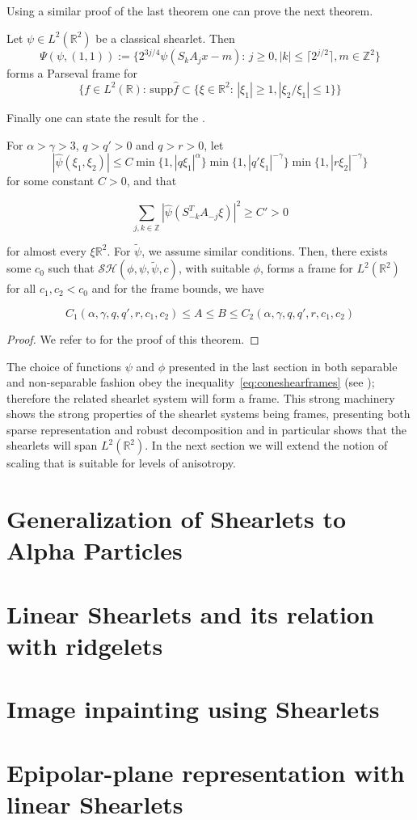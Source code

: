 Using a similar proof of the last theorem one can prove the next theorem.

\begin{thm}
Let $\psi\in L^2(\mathbb{R}^2)$ be a classical shearlet. Then 
$$
\Psi(\psi,(1,1)):=\{2^{3j/4}\psi(S_kA_jx-m)\text{: }j\geq 0,|k|\leq\lceil 2^{j/2}\rceil,m\in\mathbb{Z}^2\}
$$
forms a Parseval frame for 
$$
\{f\in L^2(\mathbb{R})\text{:  supp}\hat{f}\subset\{\xi\in\mathbb{R}^2\text{:  }|\xi_1|\geq 1,|\xi_2/\xi_1|\leq 1\}\}
$$
\end{thm}

Finally one can state the result for the .

\begin{thm}
For $\alpha >\gamma>3$, $q>q'>0$ and $q>r>0$, let 
\begin{equation}
\label{eq:coneshearframes}
|\hat{\psi}(\xi_1,\xi_2)|\leq C\min\{1,|q\xi_1|^{\alpha}\}\min\{1,|q'\xi_1|^{-\gamma}\}\min\{1,|r\xi_2|^{-\gamma}\}
\end{equation}
for some constant $C>0$, and that

$$
\sum_{j,k\in\mathbb{Z}}|\hat{\psi}(S^T_{-k}A_{-j}\xi)|^2\geq C'>0
$$

for almost every $\xi\mathbb{R}^2$. For $\tilde{\psi}$, we assume similar conditions. Then, there exists some $c_0$ such that $\mathcal{SH}(\phi,\psi,\tilde{\psi},c)$, with suitable $\phi$, forms a frame for $L^2(\mathbb{R}^2)$ for all $c_1,c_2<c_0$ and for the frame bounds, we have 

$$
C_1(\alpha,\gamma,q,q',r,c_1,c_2)\leq A\leq B\leq C_2(\alpha,\gamma,q,q',r,c_1,c_2)
$$

\end{thm}
\begin{proof}
We refer to \cite{FirstShearlets} for the proof of this theorem. 
\end{proof}

The choice of functions $\psi$ and $\phi$ presented in the last section in both separable and non-separable fashion obey the inequality~\ref{eq:coneshearframes} (see \cite{Nonseparableshear}); therefore the related shearlet system will form a frame. This strong machinery shows the strong properties of the shearlet systems being frames, presenting both sparse representation and robust decomposition and in particular shows that the shearlets will span $L^2(\mathbb{R}^2)$. In the next section we will extend the notion of scaling that is suitable for levels of anisotropy. 

\section{Generalization of Shearlets to Alpha Particles}
\label{sec:AlphaShearlets}

\section{Linear Shearlets and its relation with ridgelets}

\section{Image inpainting using Shearlets}

\section{Epipolar-plane representation with linear Shearlets}
